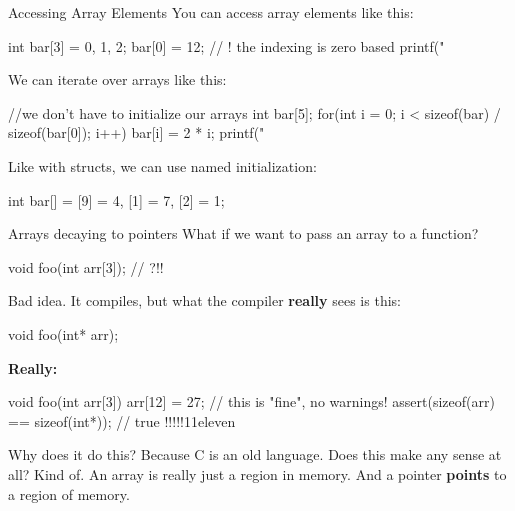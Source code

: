 \documentclass[10pt,graphics,aspectratio=169,table]{beamer}
\begin{document}
\begin{frame}[fragile]{Accessing Array Elements}
    You can access array elements like this: 
    \begin{codeblock}
int bar[3] = {0, 1, 2};
bar[0] = 12; // ! the indexing is zero based
printf("%
    \end{codeblock}

    We can iterate over arrays like this: 
    \begin{codeblock}
//we don't have to initialize our arrays
int bar[5];
for(int i = 0; i < sizeof(bar) / sizeof(bar[0]); i++){
    bar[i] = 2 * i;
    printf("%
}    
    \end{codeblock}
  

    Like with structs, we can use named initialization: 
    \begin{codeblock}
int bar[] = {[9] = 4, [1] = 7, [2] = 1};
    \end{codeblock}
\end{frame}

\begin{frame}[fragile]{Arrays decaying to pointers}
    What if we want to pass an array to a function?
    \begin{codeblock}
void foo(int arr[3]); // ?!!
    \end{codeblock}

    Bad idea. It compiles, but what the compiler \textbf{really} sees is this:
    \begin{codeblock}
void foo(int* arr);
    \end{codeblock} 

    \textbf{Really:}
    \begin{codeblock}
void foo(int arr[3]){
    arr[12] = 27; // this is "fine", no warnings!
    assert(sizeof(arr) == sizeof(int*)); // true !!!!!11eleven
}
    \end{codeblock} 

    Why does it do this? Because C is an old language.
    Does this make any sense at all? Kind of. 
    An array is really just a region in memory. And a pointer 
    \textbf{points} to a region of memory.
 
\end{frame}
\end{document}
